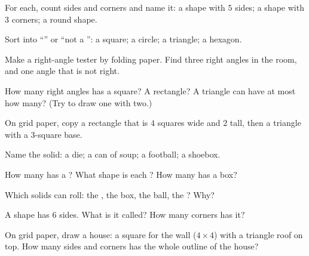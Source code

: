 \begin{exercise}[$\star$]\label{exo:g2:shapes:1}
For each, count sides and corners and name it: a shape with $5$
sides; a shape with $3$ corners; a round shape.
\end{exercise}

\begin{exercise}[$\star$]\label{exo:g2:shapes:2}
Sort into ``'' or ``not a '': a square; a circle; a
triangle; a hexagon.
\end{exercise}

\begin{exercise}[$\star$]\label{exo:g2:shapes:3}
Make a right-angle tester by folding paper. Find three right angles
in the room, and one angle that is not right.
\end{exercise}

\begin{exercise}[$\star$]\label{exo:g2:shapes:4}
How many right angles has a square? A rectangle? A triangle can have
at most how many? (Try to draw one with two.)
\end{exercise}

\begin{exercise}[$\star$]\label{exo:g2:shapes:5}
On grid paper, copy a rectangle that is $4$ squares wide and $2$
tall, then a triangle with a $3$-square base.
\end{exercise}

\begin{exercise}[$\star$]\label{exo:g2:shapes:6}
Name the solid: a die; a can of soup; a football; a shoebox.
\end{exercise}

\begin{exercise}[$\star$]\label{exo:g2:shapes:7}
How many  has a ? What shape is each ? How many 
has a box?
\end{exercise}

\begin{exercise}[$\star$]\label{exo:g2:shapes:8}
Which solids can roll: the , the box, the ball, the ?
Why?
\end{exercise}

\begin{exercise}[$\star$]\label{exo:g2:shapes:9}
A shape has $6$ sides. What is it called? How many corners has it?
\end{exercise}

\begin{exercise}[$\star\star$]\label{exo:g2:shapes:10}
On grid paper, draw a house: a square for the wall
($4 \times 4$) with a triangle roof on top. How many sides and
corners has the whole outline of the house?
\end{exercise}
